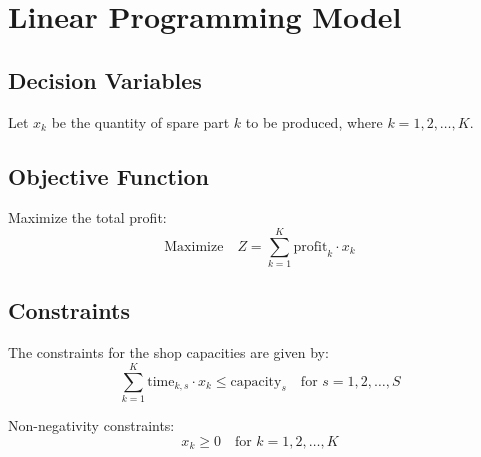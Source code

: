 \documentclass{article}
\begin{document}
\section*{Linear Programming Model}

\subsection*{Decision Variables}
Let \( x_k \) be the quantity of spare part \( k \) to be produced, where \( k = 1, 2, \ldots, K \).

\subsection*{Objective Function}
Maximize the total profit:
\[
\text{Maximize} \quad Z = \sum_{k=1}^{K} \text{profit}_k \cdot x_k
\]

\subsection*{Constraints}
The constraints for the shop capacities are given by:
\[
\sum_{k=1}^{K} \text{time}_{k, s} \cdot x_k \leq \text{capacity}_s \quad \text{for } s = 1, 2, \ldots, S
\]

Non-negativity constraints:
\[
x_k \geq 0 \quad \text{for } k = 1, 2, \ldots, K
\]
\end{document}
